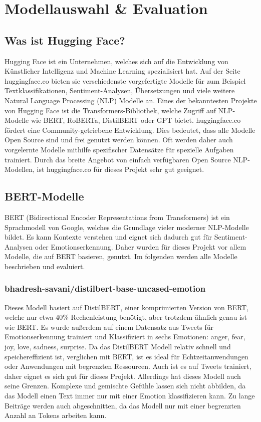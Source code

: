\section{Modellauswahl \& Evaluation}

\subsection{Was ist Hugging Face?}
Hugging Face ist ein Unternehmen, welches sich auf die Entwicklung von Künstlicher Intelligenz und Machine Learning spezialisiert hat. Auf der Seite huggingface.co bieten sie verschiedenste vorgefertigte Modelle für zum Beispiel Textklassifikationen, Sentiment-Analysen, Übersetzungen und viele weitere Natural Language Processing (NLP) Modelle an. Eines der bekanntesten Projekte von Hugging Face ist die Transformers-Bibliothek, welche Zugriff auf NLP-Modelle wie BERT, RoBERTa, DistilBERT oder GPT bietet. huggingface.co fördert eine Community-getriebene Entwicklung. Dies bedeutet, dass alle Modelle Open Source sind und frei genutzt werden können. Oft werden daher auch vorgelernte Modelle mithilfe spezifischer Datensätze für spezielle Aufgaben trainiert. Durch das breite Angebot von einfach verfügbaren Open Source NLP-Modellen, ist huggingface.co für dieses Projekt sehr gut geeignet.

\subsection{BERT-Modelle}
BERT (Bidirectional Encoder Representations from Transformers) ist ein Sprachmodell von Google, welches die Grundlage vieler moderner NLP-Modelle bildet. Es kann Kontexte verstehen und eignet sich dadurch gut für Sentiment-Analysen oder Emotionserkennung. Daher wurden für dieses Projekt vor allem Modelle, die auf BERT basieren, genutzt. Im folgenden werden alle Modelle beschrieben und evaluiert.

\subsubsection{bhadresh-savani/distilbert-base-uncased-emotion}
Dieses Modell basiert auf DistilBERT, einer komprimierten Version von BERT, welche nur etwa 40\% Rechenleistung benötigt, aber trotzdem ähnlich genau ist wie BERT. Es wurde außerdem auf einem Datensatz aus Tweets für Emotionserkennung trainiert und Klassifiziert in sechs Emotionen: anger, fear, joy, love, sadness, surprise. Da das DistilBERT Modell relativ schnell und speichereffizient ist, verglichen mit BERT, ist es ideal für Echtzeitanwendungen oder Anwendungen mit begrenzten Ressourcen. Auch ist es auf Tweets trainiert, daher eignet es sich gut für dieses Projekt. Allerdings hat dieses Modell auch seine Grenzen. Komplexe und gemischte Gefühle lassen sich nicht abbilden, da das Modell einen Text immer nur mit einer Emotion klassifizieren kann. Zu lange Beiträge werden auch abgeschnitten, da das Modell nur mit einer begrenzten Anzahl an Tokens arbeiten kann.

